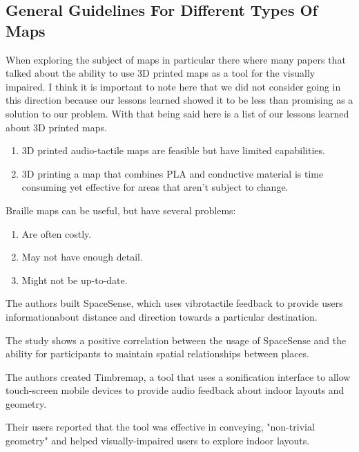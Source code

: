 \documentclass{article}
\begin{document}
\subsection{General Guidelines For Different Types Of Maps}
When exploring the subject of maps in particular there where many papers that talked about the ability to use 3D printed maps as a tool for the visually impaired. I think it is important to note here that we did not consider going in this direction because our lessons learned showed it to be less than promising as a solution to our problem. With that being said here is a list of our lessons learned about 3D printed maps.
\newline
\cite{10.1007/978-3-319-41267-2_20}
\begin{enumerate}
    \item 3D printed audio-tactile maps are feasible but have limited capabilities. 
    \item 3D printing a map that combines PLA and conductive material is time consuming yet effective for areas that aren't subject to change. 
\end{enumerate}
\cite{10.1145/2207676.2207734}
Braille maps can be useful, but have several problems:
\begin{enumerate}
\item Are often costly.
\item May not have enough detail.
\item Might not be up-to-date.
\end{enumerate}

The authors built SpaceSense, which uses vibrotactile feedback to provide users informationabout distance and direction towards a particular destination.
\newline
\par The study shows a positive correlation between the usage of SpaceSense and the ability for participants to maintain spatial relationships between places.


\cite{10.1145/1851600.1851606}
\par The authors created Timbremap, a tool that uses a sonification interface to allow touch-screen mobile devices to provide audio feedback about indoor layouts and geometry.
\newline
\par Their users reported that the tool was effective in conveying, "non-trivial geometry" and helped visually-impaired users to explore indoor layouts.
\newline
\end{document}
